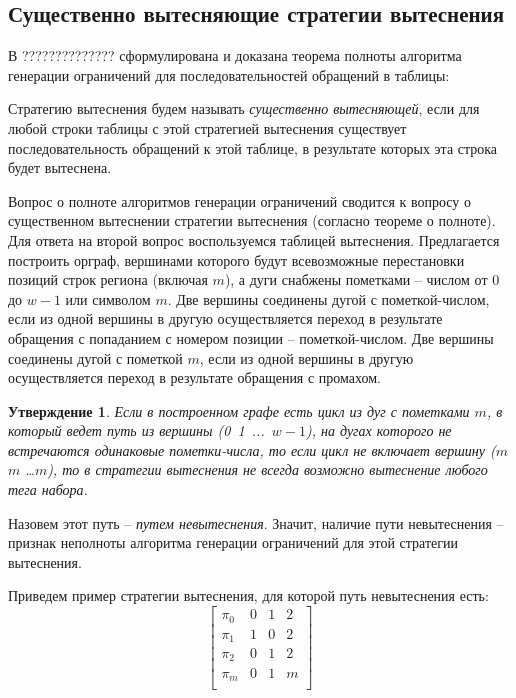 \documentclass[14pt]{extreport}
\newtheorem{utv}{Утверждение}
\begin{document}
\subsection{Существенно вытесняющие стратегии вытеснения}\label{sec:essentially_displacing}

В ?????????????? сформулирована и доказана теорема полноты алгоритма генерации ограничений для последовательностей обращений в таблицы: \textit{\FullnessMirror}

Стратегию вытеснения будем называть \emph{существенно вытесняющей}, если для любой строки таблицы с этой стратегией вытеснения существует последовательность обращений к
этой таблице, в результате которых эта строка будет вытеснена.

Вопрос о полноте алгоритмов генерации ограничений сводится к вопросу о существенном вытеснении стратегии вытеснения (согласно теореме о полноте). Для ответа на второй вопрос воспользуемся таблицей вытеснения. Предлагается построить орграф, вершинами которого будут всевозможные перестановки позиций строк региона (включая $m$), а дуги снабжены пометками -- числом от 0 до $w{-}1$ или символом
$m$. Две вершины соединены дугой с пометкой-числом, если из одной
вершины в другую осуществляется переход в результате обращения с попаданием с
номером позиции -- пометкой-числом. Две вершины соединены дугой с пометкой $m$,
если из одной вершины в другую осуществляется переход в результате обращения с промахом.

\begin{utv}
Если в построенном графе есть цикл из дуг с пометками $m$, в который
ведет путь из вершины (0~1~...~$w{-}1$), на дугах которого не
встречаются одинаковые пометки-числа, то если цикл не включает
вершину ($m$ $m$ \dots $m$), то в стратегии вытеснения не всегда
возможно вытеснение любого тега набора.
\end{utv}

Назовем этот путь -- \emph{путем невытеснения}. Значит, наличие
пути невытеснения -- признак неполноты алгоритма генерации ограничений для этой стратегии
вытеснения.

Приведем пример стратегии вытеснения, для которой путь невытеснения
есть:
$$\left[
  \begin{array}{c|cccc}
    \pi_0 & 0 & 1 & 2 \\
    \pi_1 & 1 & 0 & 2 \\
    \pi_2 & 0 & 1 & 2 \\
    \pi_m & 0 & 1 & m \\
  \end{array}
\right]
$$
\end{document}

